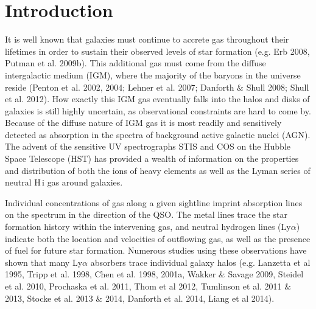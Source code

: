\documentclass[iop]{emulateapj-rtx4}
\begin{document}


%


\section{Introduction}

It is well known that galaxies must continue to accrete gas throughout their lifetimes in order to sustain their observed levels of star formation (e.g. Erb 2008, Putman et al. 2009b). This additional gas must come from the diffuse intergalactic medium (IGM), where the majority of the baryons in the universe reside (Penton et al. 2002, 2004; Lehner et al. 2007; Danforth $\&$ Shull 2008; Shull et al. 2012). How exactly this IGM gas eventually falls into the halos and disks of galaxies is still highly uncertain, as observational constraints are hard to come by. Because of the diffuse nature of IGM gas it is most readily and sensitively detected as absorption in the spectra of background active galactic nuclei (AGN). The advent of the sensitive UV spectrographs STIS and COS on the Hubble Space Telescope (HST) has provided a wealth of information on the properties and distribution of both the ions of heavy elements as well as the Lyman series of neutral H\,{\sc i} gas around galaxies. 

Individual concentrations of gas along a given sightline imprint absorption lines on the spectrum in the direction of the QSO. The metal lines trace the star formation history within the intervening gas, and neutral hydrogen lines (Ly$\alpha$) indicate both the location and velocities of outflowing gas, as well as the presence of fuel for future star formation. Numerous studies using these observations have shown that many Ly$\alpha$ absorbers trace individual galaxy halos (e.g. Lanzetta et al 1995, Tripp et al. 1998, Chen et al. 1998, 2001a, Wakker $\&$ Savage 2009, Steidel et al. 2010, Prochaska et al. 2011, Thom et al 2012, Tumlinson et al. 2011 $\&$ 2013, Stocke et al. 2013 $\&$ 2014, Danforth et al. 2014, Liang et al 2014).
\end{document}
